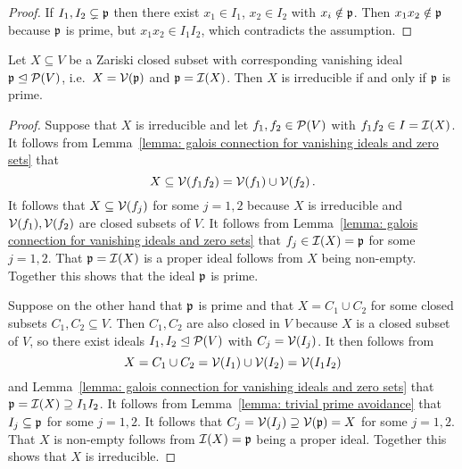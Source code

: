 \begin{proof}
  If $I_1, I_2 \subsetneq \mathfrak{p}$ then there exist $x_1 \in I_1$, $x_2 \in I_2$ with $x_i \notin \mathfrak{p}$.
  Then $x_1 x_2 \notin \mathfrak{p}$ because $\mathfrak{p}$ is prime, but $x_1 x_2 \in I_1 I_2$, which contradicts the assumption.
\end{proof}


\begin{lemma}
  \label{lemma: X is irreducible iff I(X) is prime}
  Let $X \subseteq V$ be a Zariski closed subset with corresponding vanishing ideal $\mathfrak{p} \trianglelefteq \mathcal{P}(V)$, i.e.\ $X = \mathcal{V}(\mathfrak{p})$ and $\mathfrak{p} = \mathcal{I}(X)$.
  Then $X$ is irreducible if and only if $\mathfrak{p}$ is prime.
\end{lemma}


\begin{proof}
  Suppose that $X$ is irreducible and let $f_1, f_2 \in \mathcal{P}(V)$ with $f_1 f_2 \in I = \mathcal{I}(X)$.
  It follows from Lemma~\ref{lemma: galois connection for vanishing ideals and zero sets} that
  \[
              X
    \subseteq \mathcal{V}(f_1 f_2)
    =         \mathcal{V}(f_1) \cup \mathcal{V}(f_2) \,.
  \]
  It follows that $X \subseteq \mathcal{V}(f_j)$ for some $j = 1,2$ because $X$ is irreducible and $\mathcal{V}(f_1), \mathcal{V}(f_2)$ are closed subsets of $V$.
  It follows from Lemma~\ref{lemma: galois connection for vanishing ideals and zero sets} that $f_j \in \mathcal{I}(X) = \mathfrak{p}$ for some $j = 1,2$.
  That $\mathfrak{p} = \mathcal{I}(X)$ is a proper ideal follows from $X$ being non-empty.
  Together this shows that the ideal $\mathfrak{p}$ is prime.
  
  Suppose on the other hand that $\mathfrak{p}$ is prime and that $X = C_1 \cup C_2$ for some closed subsets $C_1, C_2 \subseteq V$.
  Then $C_1, C_2$ are also closed in $V$ because $X$ is a closed subset of $V$, so there exist ideals $I_1, I_2 \trianglelefteq \mathcal{P}(V)$ with $C_j = \mathcal{V}(I_j)$.
  It then follows from
  \[
      X
    = C_1 \cup C_2
    = \mathcal{V}(I_1) \cup \mathcal{V}(I_2)
    = \mathcal{V}(I_1 I_2)
  \]
  and Lemma~\ref{lemma: galois connection for vanishing ideals and zero sets} that $\mathfrak{p} = \mathcal{I}(X) \supseteq I_1 I_2$.
  It follows from Lemma~\ref{lemma: trivial prime avoidance} that $I_j \subseteq \mathfrak{p}$ for some $j = 1,2$.
  It follows that $C_j = \mathcal{V}(I_j) \supseteq \mathcal{V}(\mathfrak{p}) = X$ for some $j = 1,2$.
  That $X$ is non-empty follows from $\mathcal{I}(X) = \mathfrak{p}$ being a proper ideal.
  Together this shows that $X$ is irreducible.
\end{proof}


